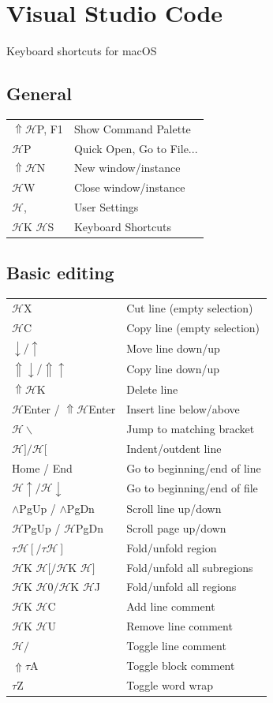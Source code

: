 \documentclass[UTF8]{article}
\begin{document}
\section*{Visual Studio Code}
Keyboard shortcuts for macOS

\subsection*{General}
\begin{tabular}{ll}
$\Uparrow\mathscr{H}$P, F1 & Show Command Palette \\
$\mathscr{H}$P & Quick Open, Go to File... \\
$\Uparrow\mathscr{H}$N & New window/instance \\
$\mathscr{H}$W & Close window/instance \\
$\mathscr{H}$, & User Settings \\
$\mathscr{H}$K $\mathscr{H}$S & Keyboard Shortcuts
\end{tabular}

\subsection*{Basic editing}
\begin{tabular}{ll}
$\mathscr{H}$X & Cut line (empty selection) \\
$\mathscr{H}$C & Copy line (empty selection) \\
$\downarrow / \uparrow$ & Move line down/up \\
$\Uparrow\downarrow / \Uparrow\uparrow$ & Copy line down/up \\
$\Uparrow\mathscr{H}$K & Delete line \\
$\mathscr{H}$Enter / $\Uparrow\mathscr{H}$Enter & Insert line below/above \\
$\mathscr{H}\backslash$ & Jump to matching bracket \\
$\mathscr{H}] / \mathscr{H}[$ & Indent/outdent line \\
Home / End & Go to beginning/end of line \\
$\mathscr{H}\uparrow / \mathscr{H}\downarrow$ & Go to beginning/end of file \\
$\wedge$PgUp / $\wedge$PgDn & Scroll line up/down \\
$\mathscr{H}$PgUp / $\mathscr{H}$PgDn & Scroll page up/down \\
$\tau\mathscr{H}[ / \tau\mathscr{H}]$ & Fold/unfold region \\
$\mathscr{H}$K $\mathscr{H}[ / \mathscr{H}$K $\mathscr{H}]$ & Fold/unfold all subregions \\
$\mathscr{H}$K $\mathscr{H}0 / \mathscr{H}$K $\mathscr{H}$J & Fold/unfold all regions \\
$\mathscr{H}$K $\mathscr{H}$C & Add line comment \\
$\mathscr{H}$K $\mathscr{H}$U & Remove line comment \\
$\mathscr{H}/$ & Toggle line comment \\
$\Uparrow\tau$A & Toggle block comment \\
$\tau$Z & Toggle word wrap
\end{tabular}
\end{document}
